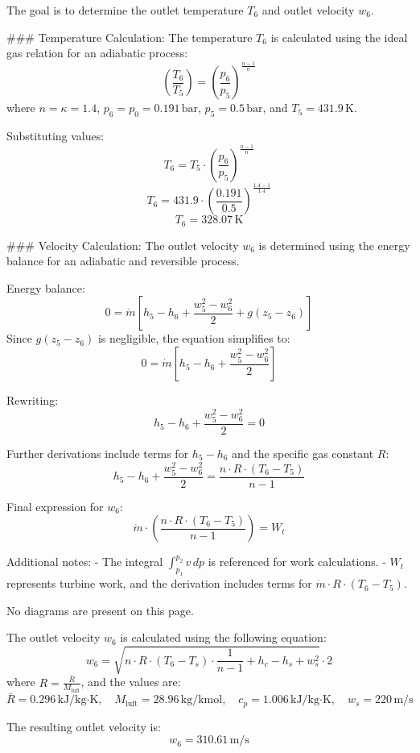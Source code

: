 The goal is to determine the outlet temperature \( T_6 \) and outlet velocity \( w_6 \).  

### Temperature Calculation:  
The temperature \( T_6 \) is calculated using the ideal gas relation for an adiabatic process:  
\[
\left( \frac{T_6}{T_5} \right) = \left( \frac{p_6}{p_5} \right)^{\frac{n-1}{n}}
\]  
where \( n = \kappa = 1.4 \), \( p_6 = p_0 = 0.191 \, \text{bar} \), \( p_5 = 0.5 \, \text{bar} \), and \( T_5 = 431.9 \, \text{K} \).  

Substituting values:  
\[
T_6 = T_5 \cdot \left( \frac{p_6}{p_5} \right)^{\frac{n-1}{n}}
\]  
\[
T_6 = 431.9 \cdot \left( \frac{0.191}{0.5} \right)^{\frac{1.4-1}{1.4}}
\]  
\[
T_6 = 328.07 \, \text{K}
\]  

### Velocity Calculation:  
The outlet velocity \( w_6 \) is determined using the energy balance for an adiabatic and reversible process.  

Energy balance:  
\[
0 = \dot{m} \left[ h_5 - h_6 + \frac{w_5^2 - w_6^2}{2} + g(z_5 - z_6) \right]
\]  
Since \( g(z_5 - z_6) \) is negligible, the equation simplifies to:  
\[
0 = \dot{m} \left[ h_5 - h_6 + \frac{w_5^2 - w_6^2}{2} \right]
\]  

Rewriting:  
\[
h_5 - h_6 + \frac{w_5^2 - w_6^2}{2} = 0
\]  

Further derivations include terms for \( h_5 - h_6 \) and the specific gas constant \( R \):  
\[
h_5 - h_6 + \frac{w_5^2 - w_6^2}{2} = \frac{n \cdot R \cdot (T_6 - T_5)}{n-1}
\]  

Final expression for \( w_6 \):  
\[
\dot{m} \cdot \left( \frac{n \cdot R \cdot (T_6 - T_5)}{n-1} \right) = W_t
\]  

Additional notes:  
- The integral \( \int_{p_1}^{p_2} v \, dp \) is referenced for work calculations.  
- \( W_t \) represents turbine work, and the derivation includes terms for \( \dot{m} \cdot R \cdot (T_6 - T_5) \).  

No diagrams are present on this page.

The outlet velocity \( w_6 \) is calculated using the following equation:  
\[
w_6 = \sqrt{n \cdot R \cdot (T_6 - T_s) \cdot \frac{1}{n-1} + h_c - h_s + w_s^2} \cdot 2
\]  
where \( R = \frac{\bar{R}}{M_{\text{luft}}} \), and the values are:  
\[
\bar{R} = 0.296 \, \text{kJ/kg·K}, \quad M_{\text{luft}} = 28.96 \, \text{kg/kmol}, \quad c_p = 1.006 \, \text{kJ/kg·K}, \quad w_s = 220 \, \text{m/s}
\]  

The resulting outlet velocity is:  
\[
w_6 = 310.61 \, \text{m/s}
\]  

